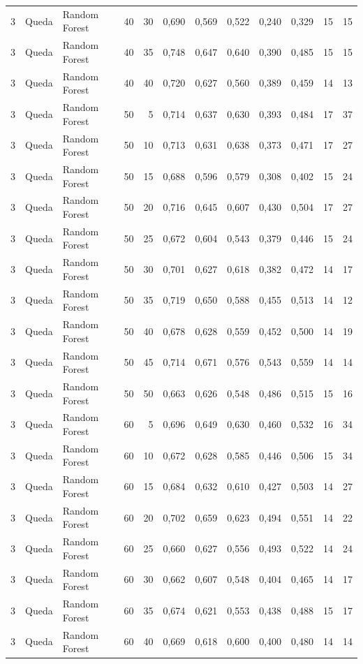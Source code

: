\begin{longtable}{@{}rllrrrrrrrrr@{}}
3 & Queda & Random Forest & 40 & 30 & 0,690 & 0,569 & 0,522 & 0,240 & 0,329 & 15 & 15 \\
3 & Queda & Random Forest & 40 & 35 & 0,748 & 0,647 & 0,640 & 0,390 & 0,485 & 15 & 15 \\
3 & Queda & Random Forest & 40 & 40 & 0,720 & 0,627 & 0,560 & 0,389 & 0,459 & 14 & 13 \\
3 & Queda & Random Forest & 50 & 5 & 0,714 & 0,637 & 0,630 & 0,393 & 0,484 & 17 & 37 \\
3 & Queda & Random Forest & 50 & 10 & 0,713 & 0,631 & 0,638 & 0,373 & 0,471 & 17 & 27 \\
3 & Queda & Random Forest & 50 & 15 & 0,688 & 0,596 & 0,579 & 0,308 & 0,402 & 15 & 24 \\
3 & Queda & Random Forest & 50 & 20 & 0,716 & 0,645 & 0,607 & 0,430 & 0,504 & 17 & 27 \\
3 & Queda & Random Forest & 50 & 25 & 0,672 & 0,604 & 0,543 & 0,379 & 0,446 & 15 & 24 \\
3 & Queda & Random Forest & 50 & 30 & 0,701 & 0,627 & 0,618 & 0,382 & 0,472 & 14 & 17 \\
3 & Queda & Random Forest & 50 & 35 & 0,719 & 0,650 & 0,588 & 0,455 & 0,513 & 14 & 12 \\
3 & Queda & Random Forest & 50 & 40 & 0,678 & 0,628 & 0,559 & 0,452 & 0,500 & 14 & 19 \\
3 & Queda & Random Forest & 50 & 45 & 0,714 & 0,671 & 0,576 & 0,543 & 0,559 & 14 & 14 \\
3 & Queda & Random Forest & 50 & 50 & 0,663 & 0,626 & 0,548 & 0,486 & 0,515 & 15 & 16 \\
3 & Queda & Random Forest & 60 & 5 & 0,696 & 0,649 & 0,630 & 0,460 & 0,532 & 16 & 34 \\
3 & Queda & Random Forest & 60 & 10 & 0,672 & 0,628 & 0,585 & 0,446 & 0,506 & 15 & 34 \\
3 & Queda & Random Forest & 60 & 15 & 0,684 & 0,632 & 0,610 & 0,427 & 0,503 & 14 & 27 \\
3 & Queda & Random Forest & 60 & 20 & 0,702 & 0,659 & 0,623 & 0,494 & 0,551 & 14 & 22 \\
3 & Queda & Random Forest & 60 & 25 & 0,660 & 0,627 & 0,556 & 0,493 & 0,522 & 14 & 24 \\
3 & Queda & Random Forest & 60 & 30 & 0,662 & 0,607 & 0,548 & 0,404 & 0,465 & 14 & 17 \\
3 & Queda & Random Forest & 60 & 35 & 0,674 & 0,621 & 0,553 & 0,438 & 0,488 & 15 & 17 \\
3 & Queda & Random Forest & 60 & 40 & 0,669 & 0,618 & 0,600 & 0,400 & 0,480 & 14 & 14 \\

\end{longtable}
